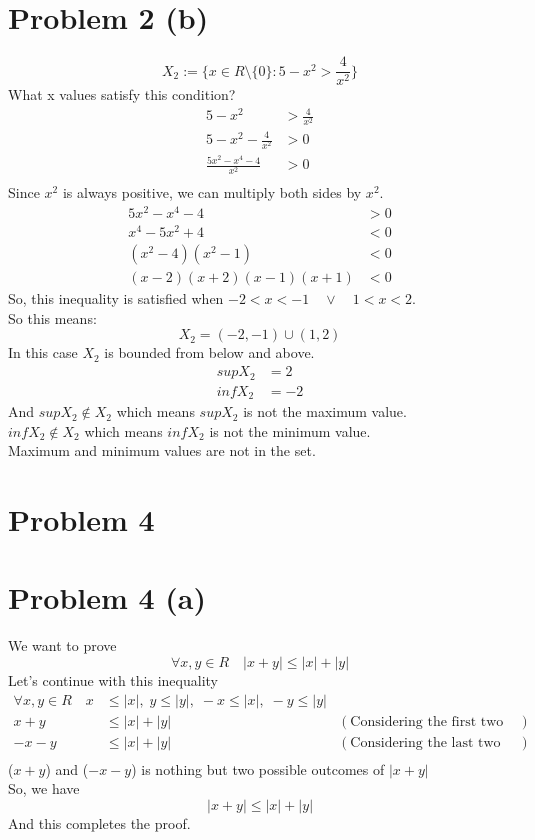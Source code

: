 \documentclass{article}
\begin{document}
\section*{Problem 2 (b)}
\[
   X_2 := \{x \in R \setminus \{0\}: 5 - x^2 > \frac{4}{x^2}\}
\]
What x values satisfy this condition? \\
\begin{align*}
   5 - x^2 &> \frac{4}{x^2} \\
   5 - x^2 - \frac{4}{x^2} &> 0 \\
   \frac{5x^2 - x^4 - 4}{x^2} &> 0 \\
\end{align*}
Since \(x^2\) is always positive, we can multiply both sides by \(x^2\).\\
\begin{align*}
   5x^2 - x^4 - 4 &> 0 \\
   x^4 - 5x^2 + 4 &< 0 \\
   (x^2 - 4)(x^2 - 1) &< 0 \\
   (x - 2)(x + 2)(x - 1)(x + 1) &< 0
\end{align*}
So, this inequality is satisfied when \(-2 < x < -1 \quad \lor \quad 1 < x < 2\).\\
So this means:
\[
   X_2 = (-2, -1) \cup (1, 2)
\]
In this case \(X_2\) is bounded from below and above.\\
\begin{align*}
   sup X_2 &= 2 \\
   inf X_2 &= -2
\end{align*}
And \(sup X_2 \notin X_2\) which means \(sup X_2\) is not the maximum value.\\
\(inf X_2 \notin X_2\) which means \(inf X_2\) is not the minimum value.\\
Maximum and minimum values are not in the set.\\

\section*{Problem 4}
\section*{Problem 4 (a)}
We want to prove
\[
   \forall x,y \in R \quad |x + y| \leq |x| + |y|
\]
Let's continue with this inequality
\begin{align*}
   \forall x,y \in R \quad x &\leq |x|, \;  y \leq |y|, \; -x \leq |x|, \;  -y \leq |y| \\
   x + y &\leq |x| + |y| &(\text{Considering the first two inequalities above}) \\
   -x - y &\leq |x| + |y| &(\text{Considering the last two inequalities above}) \\
\end{align*}
(\(x+y\)) and (\(-x-y\)) is nothing but two possible outcomes of \(|x+y|\) \\
So, we have
\[
   |x + y| \leq |x| + |y|
\]
And this completes the proof.\\
\end{document}
